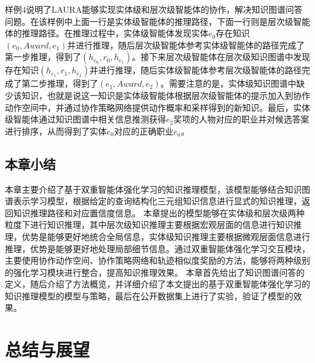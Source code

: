 \documentclass[algorithmlist, AutoFakeBold, AutoFakeSlant, figurelist, tablelist, nomlist, engineering]{seuthesix}
\begin{document}
样例4说明了LAURA能够实现实体级和层次级智能体的协作，解决知识图谱问答问题。在该样例中上面一行是实体级智能体的推理路径，下面一行则是层次级智能体的推理路径。在推理过程中，实体级智能体发现实体$e_0$存在知识$(e_0, Award, e_1)$并进行推理，随后层次级智能体参考实体级智能体的路径完成了第一步推理，得到了$(h_{e_0}, r_0, h_{e_1})$。接下来层次级智能体在层次级知识图谱中发现存在知识$(h_{e_1}, r_1, h_{e_2})$并进行推理，随后实体级智能体参考层次级智能体的路径完成了第二步推理，得到了$(e_1, Award, e_2)$。需要注意的是，实体级知识图谱中缺少该知识，也就是说这一知识是实体级智能体根据层次级智能体的提示加入到协作动作空间中，并通过协作策略网络提供动作概率和采样得到的新知识。最后，实体级智能体通过知识图谱中相关信息推测获得$e_2$奖项的人物对应的职业并对候选答案进行排序，从而得到了实体$e_0$对应的正确职业$e_a$。

\section{本章小结}
本章主要介绍了基于双重智能体强化学习的知识推理模型，该模型能够结合知识图谱表示学习模型，根据给定的查询结构化三元组知识信息进行显式的知识推理，返回知识推理路径和对应置信度信息。
本章提出的模型能够在实体级和层次级两种粒度下进行知识推理，其中层次级知识推理主要根据宏观层面的信息进行知识推理，优势是能够更好地统合全局信息，实体级知识推理主要根据微观层面信息进行推理，优势是能够更好地处理局部细节信息。通过双重智能体强化学习交互模块，主要使用协作动作空间、协作策略网络和轨迹相似度奖励的方法，能够将两种级别的强化学习模块进行整合，提高知识推理效果。
本章首先给出了知识图谱问答的定义，随后介绍了方法概览，并详细介绍了本文提出的基于双重智能体强化学习的知识推理模型的模型与策略，最后在公开数据集上进行了实验，验证了模型的效果。


\chapter{总结与展望}
\end{document}
